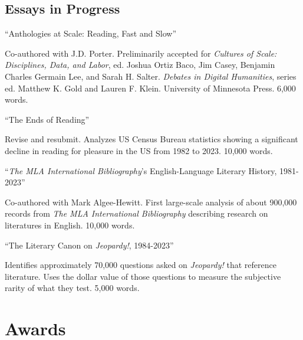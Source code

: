 \documentclass[12pt,letterpaper]{report}
\begin{document}
\subsection*{Essays in Progress}

\enquote{Anthologies at Scale: Reading, Fast and Slow}

\begin{adjustwidth}{2em}{}
	Co-authored with J.D. Porter. Preliminarily accepted for \textit{Cultures of Scale: Disciplines, Data, and Labor}, ed. Joshua Ortiz Baco, Jim Casey, Benjamin Charles Germain Lee, and Sarah H. Salter. \textit{Debates in Digital Humanities}, series ed. Matthew K. Gold and Lauren F. Klein. University of Minnesota Press. 6,000 words.
\end{adjustwidth}

\medskip

\enquote{The Ends of Reading}

\begin{adjustwidth}{2em}{}
	Revise and resubmit. Analyzes US Census Bureau statistics showing a significant decline in reading for pleasure in the US from 1982 to 2023. 10,000 words.
\end{adjustwidth}

\medskip

\enquote{\emph{The MLA International Bibliography}'s English-Language Literary History, 1981-2023}

\begin{adjustwidth}{2em}{}
	Co-authored with Mark Algee-Hewitt. First large-scale analysis of about 900,000 records from \textit{The MLA International Bibliography} describing research on literatures in English. 10,000 words.
\end{adjustwidth}

\medskip

\enquote{The Literary Canon on \emph{Jeopardy!}, 1984-2023}

\begin{adjustwidth}{2em}{}
	Identifies approximately 70,000 questions asked on \emph{Jeopardy!} that reference literature. Uses the dollar value of those questions to measure the subjective rarity of what they test. 5,000 words.
\end{adjustwidth}

\section*{Awards}
\end{document}
